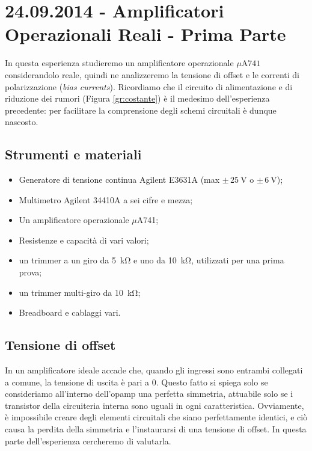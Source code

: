 \section{24.09.2014 - Amplificatori Operazionali Reali - Prima Parte}

In questa esperienza studieremo un amplificatore operazionale $\mu$A$741$ considerandolo reale, quindi ne analizzeremo la tensione di offset e le correnti di polarizzazione (\textit{bias currents}).
Ricordiamo che il circuito di alimentazione e di riduzione dei rumori (Figura \ref{gr:costante}) è il medesimo dell'esperienza precedente: per facilitare la comprensione degli schemi circuitali è dunque nascosto.

\subsection*{Strumenti e materiali}

\begin{itemize} [noitemsep]
\item Generatore di tensione continua Agilent E3631A (max $\pm \, \SI{25}{\volt}$ o $\pm \, \SI{6}{\volt}$);
\item Multimetro Agilent 34410A a sei cifre e mezza;
\item Un amplificatore operazionale $\mu$A741;
\item Resistenze e capacità di vari valori;
\item un trimmer a un giro da \SI{5}{\kilo\ohm} e uno da \SI{10}{\kilo\ohm}, utilizzati per una prima prova;
\item un trimmer multi-giro da \SI{10}{\kilo\ohm};
\item Breadboard e cablaggi vari.
\end{itemize}

\subsection{Tensione di offset}
\label{par2:offset}

In un amplificatore ideale accade che, quando gli ingressi sono entrambi collegati a comune, la tensione di uscita è pari a $0$. Questo fatto si spiega solo se consideriamo all'interno dell'opamp una perfetta simmetria, attuabile solo se i transistor della circuiteria interna sono uguali in ogni caratteristica. Ovviamente, è impossibile creare degli elementi circuitali che siano perfettamente identici, e ciò causa la perdita della simmetria e l'instaurarsi di una tensione di offset. In questa parte dell'esperienza cercheremo di valutarla.

